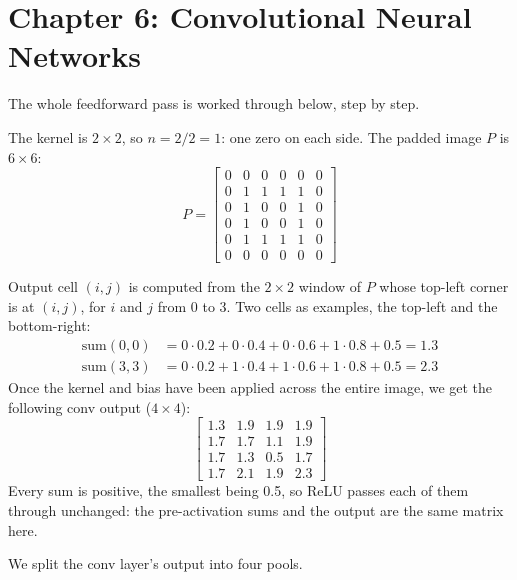 
\section{Chapter 6: Convolutional Neural Networks}
\label{sol:sec:c6}

The whole feedforward pass is worked through below, step by step.

The kernel is $2 \times 2$, so $n = 2 / 2 = 1$: one zero on each side. The padded image $P$ is
$6 \times 6$:
\[
  P = \begin{bmatrix}
    0 & 0 & 0 & 0 & 0 & 0 \\
    0 & 1 & 1 & 1 & 1 & 0 \\
    0 & 1 & 0 & 0 & 1 & 0 \\
    0 & 1 & 0 & 0 & 1 & 0 \\
    0 & 1 & 1 & 1 & 1 & 0 \\
    0 & 0 & 0 & 0 & 0 & 0
  \end{bmatrix}
\]

Output cell $(i, j)$ is computed from the $2 \times 2$ window of $P$ whose top-left corner is at
$(i, j)$, for $i$ and $j$ from 0 to 3. Two cells as examples, the top-left and the bottom-right:
\begin{align*}
  \text{sum}(0,0) &= 0 \cdot 0.2 + 0 \cdot 0.4 + 0 \cdot 0.6 + 1 \cdot 0.8 + 0.5 = 1.3 \\
  \text{sum}(3,3) &= 0 \cdot 0.2 + 1 \cdot 0.4 + 1 \cdot 0.6 + 1 \cdot 0.8 + 0.5 = 2.3
\end{align*}
Once the kernel and bias have been applied across the entire image, we get the following conv
output ($4 \times 4$):
\[
  \begin{bmatrix}
    1.3 & 1.9 & 1.9 & 1.9 \\
    1.7 & 1.7 & 1.1 & 1.9 \\
    1.7 & 1.3 & 0.5 & 1.7 \\
    1.7 & 2.1 & 1.9 & 2.3
  \end{bmatrix}
\]
Every sum is positive, the smallest being 0.5, so ReLU passes each of them through unchanged: the
pre-activation sums and the output are the same matrix here.

We split the conv layer's output into four pools.


